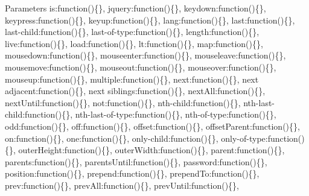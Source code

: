 \begin{DoxyParams}{Parameters}
\textquotesingle{}is\textquotesingle{}\+:function()\{\}, \textquotesingle{}jquery\textquotesingle{}\+:function()\{\}, \textquotesingle{}keydown\textquotesingle{}\+:function()\{\}, \textquotesingle{}keypress\textquotesingle{}\+:function()\{\}, \textquotesingle{}keyup\textquotesingle{}\+:function()\{\}, \textquotesingle{}lang\textquotesingle{}\+:function()\{\}, \textquotesingle{}last\textquotesingle{}\+:function()\{\}, \textquotesingle{}last-\/child\textquotesingle{}\+:function()\{\}, \textquotesingle{}last-\/of-\/type\textquotesingle{}\+:function()\{\}, \textquotesingle{}length\textquotesingle{}\+:function()\{\}, \textquotesingle{}live\textquotesingle{}\+:function()\{\}, \textquotesingle{}load\textquotesingle{}\+:function()\{\}, \textquotesingle{}lt\textquotesingle{}\+:function()\{\}, \textquotesingle{}map\textquotesingle{}\+:function()\{\}, \textquotesingle{}mousedown\textquotesingle{}\+:function()\{\}, \textquotesingle{}mouseenter\textquotesingle{}\+:function()\{\}, \textquotesingle{}mouseleave\textquotesingle{}\+:function()\{\}, \textquotesingle{}mousemove\textquotesingle{}\+:function()\{\}, \textquotesingle{}mouseout\textquotesingle{}\+:function()\{\}, \textquotesingle{}mouseover\textquotesingle{}\+:function()\{\}, \textquotesingle{}mouseup\textquotesingle{}\+:function()\{\}, \textquotesingle{}multiple\textquotesingle{}\+:function()\{\}, \textquotesingle{}next\textquotesingle{}\+:function()\{\}, \textquotesingle{}next adjacent\textquotesingle{}\+:function()\{\}, \textquotesingle{}next siblings\textquotesingle{}\+:function()\{\}, \textquotesingle{}next\+All\textquotesingle{}\+:function()\{\}, \textquotesingle{}next\+Until\textquotesingle{}\+:function()\{\}, \textquotesingle{}not\textquotesingle{}\+:function()\{\}, \textquotesingle{}nth-\/child\textquotesingle{}\+:function()\{\}, \textquotesingle{}nth-\/last-\/child\textquotesingle{}\+:function()\{\}, \textquotesingle{}nth-\/last-\/of-\/type\textquotesingle{}\+:function()\{\}, \textquotesingle{}nth-\/of-\/type\textquotesingle{}\+:function()\{\}, \textquotesingle{}odd\textquotesingle{}\+:function()\{\}, \textquotesingle{}off\textquotesingle{}\+:function()\{\}, \textquotesingle{}offset\textquotesingle{}\+:function()\{\}, \textquotesingle{}offset\+Parent\textquotesingle{}\+:function()\{\}, \textquotesingle{}on\textquotesingle{}\+:function()\{\}, \textquotesingle{}one\textquotesingle{}\+:function()\{\}, \textquotesingle{}only-\/child\textquotesingle{}\+:function()\{\}, \textquotesingle{}only-\/of-\/type\textquotesingle{}\+:function()\{\}, \textquotesingle{}outer\+Height\textquotesingle{}\+:function()\{\}, \textquotesingle{}outer\+Width\textquotesingle{}\+:function()\{\}, \textquotesingle{}parent\textquotesingle{}\+:function()\{\}, \textquotesingle{}parents\textquotesingle{}\+:function()\{\}, \textquotesingle{}parents\+Until\textquotesingle{}\+:function()\{\}, \textquotesingle{}password\textquotesingle{}\+:function()\{\}, \textquotesingle{}position\textquotesingle{}\+:function()\{\}, \textquotesingle{}prepend\textquotesingle{}\+:function()\{\}, \textquotesingle{}prepend\+To\textquotesingle{}\+:function()\{\}, \textquotesingle{}prev\textquotesingle{}\+:function()\{\}, \textquotesingle{}prev\+All\textquotesingle{}\+:function()\{\}, \textquotesingle{}prev\+Until\textquotesingle{}\+:function()\{\}, 
\end{DoxyParams}
